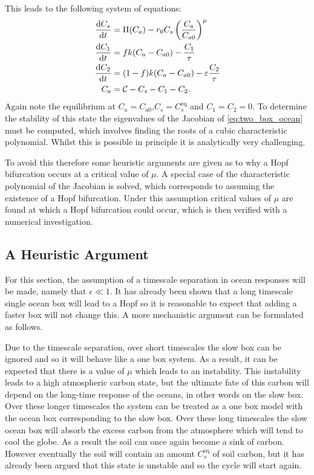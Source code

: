 This leads to the following system of equations:
\begin{subequations}
  \label{eq:two_box_ocean}
  \begin{align}
    \dv{C_s}{t} &= \Pi(C_a) - r_0 C_s \left(\frac{C_a}{C_{a0}}\right)^{\mu} \\
    \dv{C_1}{t} &= fk(C_a - C_{a0}) - \frac{C_1}{\tau} \\
    \dv{C_2}{t} &= (1-f)k(C_a-C_{a0}) - \varepsilon\frac{C_2}{\tau} \\
    C_a &= \mathcal{C} - C_s - C_1 - C_2.
  \end{align}
\end{subequations}
Again note the equilibrium at $C_a = C_{a0}$,$C_s = C_s^{\mathrm{eq}}$ and $C_1 = C_2 = 0$. To determine the stability of this state the eigenvalues of the Jacobian
of \cref{eq:two_box_ocean} must be computed, which involves finding the roots of a cubic characteristic polynomial.
Whilst this is possible in principle it is analytically very challenging.

To avoid this therefore some heuristic arguments are given as to why a Hopf bifurcation occurs at a critical value of $\mu$. A special case of the 
characteristic polynomial of the Jacobian is solved, which corresponds to assuming the existence of a Hopf bifurcation. Under this assumption 
critical values of $\mu$ are found at which a Hopf bifurcation could occur, which is then verified with a numerical investigation.

\subsection{A Heuristic Argument}
For this section, the assumption of a timescale separation in ocean responses will be made, namely that $\epsilon \ll 1$. It has already been shown that a long timescale
single ocean box will lead to a Hopf so it is reasonable to expect that adding a faster box will not change this. A more mechanistic argument can be formulated as follows.

Due to the timescale
separation, over short timescales the slow box can be ignored and so it will behave like a one box system. As a result, it can be expected that there
is a value of $\mu$ which leads to an instability. This instability leads to a high atmospheric carbon state, but the ultimate fate of this carbon will depend on the long-time response of the oceans, in other
words on the slow box. Over these longer timescales the system can be treated as a one box model with the ocean box corresponding to the slow box.
Over these long timescales the slow ocean box will absorb the excess carbon from the atmosphere which will tend to cool the globe. As a result
the soil can once again become a sink of carbon. However eventually the soil will contain an amount $C_s^{\mathrm{eq}}$ of soil carbon, but it has already been argued that this state is unstable
and so the cycle will start again.

